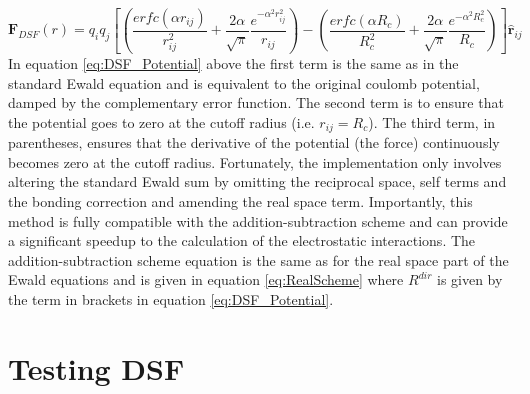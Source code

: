 \begin{equation}
  \mathbf{F}_{DSF}(r) = q_i q_j \left[ \left( \frac{erfc(\alpha r_{ij})}{r_{ij}^2} + \frac{2 \alpha}{\sqrt{\pi}} \frac{e^{-\alpha^2 r_{ij}^2}}{r_{ij}}\right) - \left(\frac{erfc(\alpha                   R_{c})}{R_{c}^2} + \frac{2 \alpha}{\sqrt{\pi}} \frac{e^{-\alpha^2 R_{c}^2}}{R_{c}} \right) \right] \hat{\mathbf{r}}_{ij}
  \label{eq:DSF_Force}
\end{equation}
In equation \eqref{eq:DSF_Potential} above the first term is the same as in the standard Ewald equation and is equivalent to the original coulomb potential, damped by the complementary error function. The second term is to ensure that the potential goes to zero at the cutoff radius (i.e. $r_{ij} = R_{c}$). The third term, in parentheses, ensures that the derivative of the potential (the force) continuously becomes zero at the cutoff radius. Fortunately, the implementation only involves altering the standard Ewald sum by omitting the reciprocal space, self terms and the bonding correction and amending the real space term. Importantly, this method is fully compatible with the addition-subtraction scheme and can provide a significant speedup to the calculation of the electrostatic interactions. The addition-subtraction scheme equation is the same as for the real space part of the Ewald equations and is given in equation \eqref{eq:RealScheme} where $R^{dir}$ is given by the term in brackets in equation \eqref{eq:DSF_Potential}.
\section{Testing DSF}
